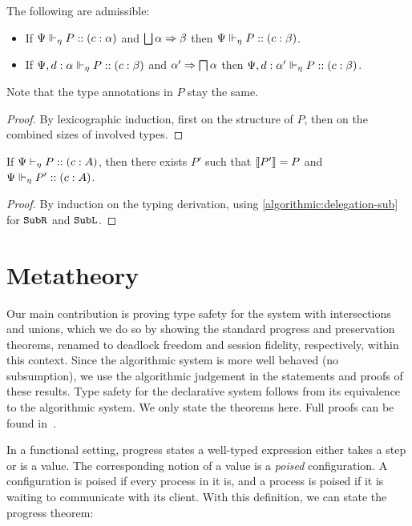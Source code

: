 \documentclass[submission,copyright,creativecommons]{eptcs}
\begin{document}
\begin{lemma}
  \label{algorithmic:delegation-sub}
  The following are admissible:
  \begin{itemize}
    \item If ${\Psi} \Vdash_{\eta} P :: (c : \alpha)$ and $\operatorname{\bigsqcup}\alpha \Rightarrow \beta$ then ${\Psi} \Vdash_{\eta} P :: (c : \beta)$.
    \item If ${\Psi, d : \alpha} \Vdash_{\eta} P :: (c : \beta)$ and $\alpha' \Rightarrow \operatorname{\bigsqcap}\alpha$ then ${\Psi, d : \alpha'} \Vdash_{\eta} P :: (c : \beta)$.
  \end{itemize}
  Note that the type annotations in $P$ stay the same.
\end{lemma}
\begin{proof}
  By lexicographic induction, first on the structure of $P$, then on the combined sizes of involved types.
\end{proof}

\begin{theorem}
  If ${\Psi} \vdash_{\eta} P :: (c : A)$, then there exists $P'$ such that $\left \llbracket {P'} \right \rrbracket = P$ and ${\Psi} \Vdash_{\eta} P' :: (c : A)$.
\end{theorem}
\begin{proof}
  By induction on the typing derivation, using \cref{algorithmic:delegation-sub} for $\texttt{Sub}\texttt{R}$ and $\texttt{Sub}\texttt{L}$.
\end{proof}


\section{Metatheory}
\label{metatheory}

Our main contribution is proving type safety for the system with intersections and unions, which we do so by showing the standard progress and preservation theorems, renamed to deadlock freedom and session fidelity, respectively, within this context. Since the algorithmic system is more well behaved (no subsumption), we use the algorithmic judgement in the statements and proofs of these results. Type safety for the declarative system follows from its equivalence to the algorithmic system. We only state the theorems here. Full proofs can be found in~\cite{Acay16}.

In a functional setting, progress states a well-typed expression either takes a step or is a value. The corresponding notion of a value is a \emph{poised} configuration. A configuration is poised if every process in it is, and a process is poised if it is waiting to communicate with its client. With this definition, we can state the progress theorem:
\end{document}
